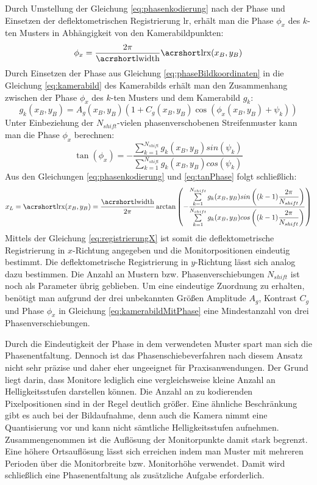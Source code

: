 \p
Durch Umstellung der Gleichung \ref{eq:phasenkodierung} nach der Phase und Einsetzen der deflektometrischen Registrierung \acrshort{lr}, erhält man die Phase $\phi_x$ des $k$-ten Musters in Abhängigkeit von den Kamerabildpunkten:
%
\begin{equation}\label{eq:phaseBildkoordinaten}
	\phi_x = \dfrac{2\pi}{\acrshortmath{lwidth}}\acrshortmath{lrx}(x_B, y_B)
\end{equation}
%
Durch Einsetzen der Phase aus Gleichung \ref{eq:phaseBildkoordinaten} in die Gleichung \ref{eq:kamerabild} des Kamerabilds erhält man den Zusammenhang zwischen der Phase $\phi_x$ des $k$-ten Musters und dem Kamerabild   $g_k$:
%
\begin{equation}\label{eq:kamerabildMitPhase}
	g_k(x_B, y_B) = A_g(x_B, y_B) \left(1 + C_g(x_B, y_B) \cos \left(\phi_x(x_B, y_B) + \psi_k\right)\right)
\end{equation}
%
Unter Einbeziehung der $N_{shift}$-vielen phasenverschobenen Streifenmuster kann man die Phase $\phi_x$ berechnen:
%
\begin{equation}\label{eq:tanPhase}
	\tan (\phi_x) = -\dfrac{\sum\limits_{k=1}^{N_{shift}} g_k(x_B, y_B) sin(\psi_k)}{\sum\limits_{k=1}^{N_{shift}} g_k(x_B, y_B) cos(\psi_k)}
\end{equation}
%
Aus den Gleichungen \ref{eq:phasenkodierung} und \ref{eq:tanPhase} folgt schließlich:
%
\begin{equation}\label{eq:registrierungX}
	x_L = \acrshortmath{lrx}(x_B, y_B) = 
	\dfrac{\acrshortmath{lwidth}}{2\pi}
	\arctan 
	\left( 
		-\dfrac
		{\sum\limits_{k=1}^{N_{shift}} g_k(x_B, y_B) sin\left((k - 1)\dfrac{2\pi}{N_{shift}}\right)}
		{\sum\limits_{k=1}^{N_{shift}} g_k(x_B, y_B) cos\left((k - 1)\dfrac{2\pi}{N_{shift}}\right)}
	\right)
\end{equation}
%
Mittels der Gleichung \ref{eq:registrierungX} ist somit die deflektometrische Registrierung in $x$-Richtung angegeben und die Monitorpositionen eindeutig bestimmt.
Die deflektometrische Registrierung in $y$-Richtung lässt sich analog dazu bestimmen.
Die Anzahl an Mustern bzw. Phasenverschiebungen $N_{shift}$ ist noch als Parameter übrig geblieben.
Um eine eindeutige Zuordnung zu erhalten, benötigt man aufgrund der drei unbekannten Größen Amplitude $A_g$, Kontrast $C_g$ und Phase $\phi_x$ in Gleichung \ref{eq:kamerabildMitPhase} eine Mindestanzahl von drei Phasenverschiebungen.

\p
Durch die Eindeutigkeit der Phase in dem verwendeten Muster spart man sich die Phasenentfaltung.
Dennoch ist das Phasenschiebeverfahren nach diesem Ansatz nicht sehr präzise und daher eher ungeeignet für Praxisanwendungen.
Der Grund liegt darin, dass Monitore lediglich eine vergleichsweise kleine Anzahl an Helligkeitsstufen darstellen können.
Die Anzahl an zu kodierenden Pixelpositionen sind in der Regel deutlich größer.
Eine ähnliche Beschränkung gibt es auch bei der Bildaufnahme, denn auch die Kamera nimmt eine Quantisierung vor und kann nicht sämtliche Helligkeitsstufen aufnehmen.
Zusammengenommen ist die Auflösung der Monitorpunkte damit stark begrenzt.
Eine höhere Ortsauflösung lässt sich erreichen indem man Muster mit mehreren Perioden über die Monitorbreite bzw. Monitorhöhe verwendet.
Damit wird schließlich eine Phasenentfaltung als zusätzliche Aufgabe erforderlich.